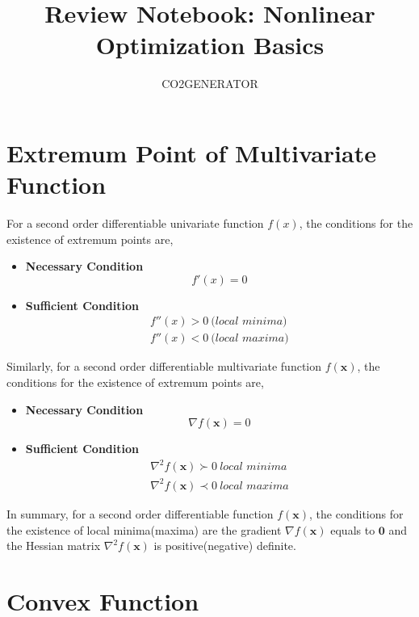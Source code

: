 \documentclass{article}
\title {Review Notebook: Nonlinear Optimization Basics}
\author{CO2GENERATOR}
\begin{document}
\maketitle 
\allowdisplaybreaks[4]

\section{Extremum Point of Multivariate Function}

For a second order differentiable univariate function $f(x)$, the conditions for the existence of extremum points are,
\begin{itemize}
	\item \textbf{Necessary Condition}
	\begin{equation}
		f'(x) = 0
	\end{equation}
	\item \textbf{Sufficient Condition}
	\begin{align}
		f''(x) > 0 \ \textit{(local minima)} \\
		f''(x) < 0 \ \textit{(local maxima)}
	\end{align}
\end{itemize}

Similarly, for a second order differentiable multivariate function $f(\bm{x})$, the conditions for the existence of extremum points are,
\begin{itemize}
	\item \textbf{Necessary Condition}
	\begin{equation}
		\nabla f(\bm{x}) = 0
	\end{equation}
	\item \textbf{Sufficient Condition}
	\begin{align}
		\nabla^2 f(\bm{x}) \succ 0 \ \textit{local minima} \\
		\nabla^2 f(\bm{x}) \prec 0 \ \textit{local maxima}
	\end{align}
\end{itemize}

In summary, for a second order differentiable function $f(\bm{x})$, the conditions for the existence of local minima(maxima) are the gradient $\nabla f(\bm{x})$ equals to $\bm{0}$ and the Hessian matrix $\nabla^2 f(\bm{x})$ is positive(negative) definite. 

\section{Convex Function}
\end{document}
